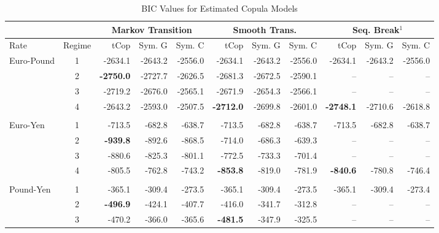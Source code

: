 \begin{landscape}

\begin{table}
	\centering
	\begin{threeparttable}
		\caption{BIC Values for Estimated Copula Models}	\label{tbl:BIC_model_comparison}
		\begin{tabular}[c]{l c r r r | r r r | r r r}
			\midrule
						&        & \multicolumn{3}{c}{Markov Transition} & \multicolumn{3}{c}{Smooth Trans.} & \multicolumn{3}{c}{Seq. Break$^{1}$} \\
			\midrule
			Rate& Regime & tCop & Sym. G & Sym. C & tCop & Sym. G & Sym. C & tCop & Sym. G & Sym. C \\
			\midrule
			Euro-Pound  & 1 &          -2634.1 & -2643.2 & -2556.0 &          -2634.1 & -2643.2 & -2556.0 &           -2634.1 & -2643.2 &  -2556.0  \\		
						& 2 & \textbf{-2750.0} & -2727.7 & -2626.5 &          -2681.3 & -2672.5 & -2590.1 &                -- &      -- &  --       \\
						& 3 &          -2719.2 & -2676.0 & -2565.1 &          -2671.9 & -2654.3 & -2566.1 &                -- &      -- &  --       \\
						& 4 &          -2643.2 & -2593.0 & -2507.5 & \textbf{-2712.0} & -2699.8 & -2601.0 &  \textbf{-2748.1} & -2710.6 &  -2618.8  \\ \\
			Euro-Yen    & 1 &           -713.5 &  -682.8 &  -638.7 &           -713.5 &  -682.8 &  -638.7 &            -713.5 &  -682.8 &   -638.7  \\
						& 2 &  \textbf{-939.8} &  -892.6 &  -868.5 &           -714.0 &  -686.3 &  -639.3 &                -- &      -- &  --       \\
						& 3 &           -880.6 &  -825.3 &  -801.1 &           -772.5 &  -733.3 &  -701.4 &                -- &      -- &  --       \\
						& 4 &           -805.5 &  -762.8 &  -743.2 &  \textbf{-853.8} &  -819.0 &  -781.9 &   \textbf{-840.6} &  -780.8 &   -746.4  \\ \\
			Pound-Yen   & 1 &           -365.1 &  -309.4 &  -273.5 &           -365.1 &  -309.4 &  -273.5 &            -365.1 &  -309.4 &   -273.4  \\
						& 2 &  \textbf{-496.9} &  -424.1 &  -407.7 &           -416.0 &  -341.7 &  -312.8 &                -- &      -- &  --       \\
						& 3 &           -470.2 &  -366.0 &  -365.6 &  \textbf{-481.5} &  -347.9 &  -325.5 &                -- &      -- &  --       \\

\end{tabular}
\end{threeparttable}
\end{table}
\end{landscape}
